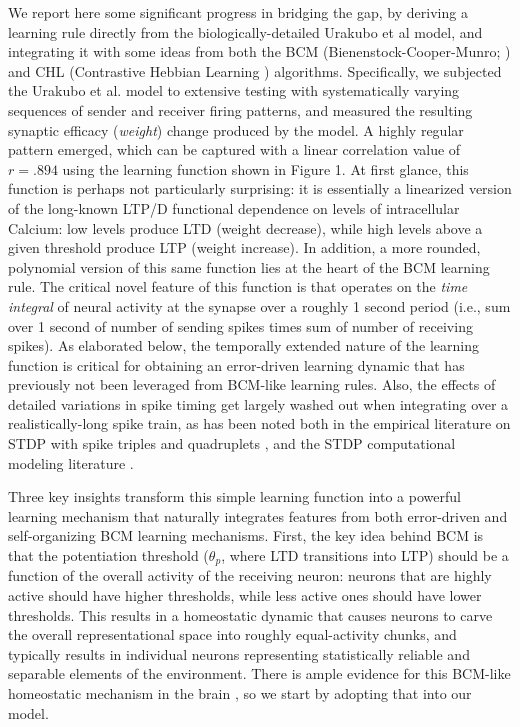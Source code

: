 \documentclass[11pt,twoside]{article}
\begin{document}
We report here some significant progress in bridging the gap, by deriving a
learning rule directly from the biologically-detailed Urakubo et al model, and
integrating it with some ideas from both the BCM (Bienenstock-Cooper-Munro;
\cite{bcm}) and CHL (Contrastive Hebbian Learning \cite{chl}) algorithms.
Specifically, we subjected the Urakubo et al. \cite{Urakubo} model to
extensive testing with systematically varying sequences of sender and receiver
firing patterns, and measured the resulting synaptic efficacy ({\em weight})
change produced by the model.  A highly regular pattern emerged, which can be
captured with a linear correlation value of $r=.894$ using the learning
function shown in Figure 1.  At first glance, this function is perhaps not
particularly surprising: it is essentially a linearized version of the
long-known LTP/D functional dependence on levels of intracellular Calcium: low
levels produce LTD (weight decrease), while high levels above a given
threshold produce LTP (weight increase).  In addition, a more rounded,
polynomial version of this same function lies at the heart of the BCM learning
rule.  The critical novel feature of this function is that operates on the
{\em time integral} of neural activity at the synapse over a roughly 1 second
period (i.e., sum over 1 second of number of sending spikes times sum of
number of receiving spikes).  As elaborated below, the temporally extended
nature of the learning function is critical for obtaining an error-driven
learning dynamic that has previously not been leveraged from BCM-like learning
rules.  Also, the effects of detailed variations in spike timing get largely
washed out when integrating over a realistically-long spike train, as has been
noted both in the empirical literature on STDP with spike triples and
quadruplets \cite{stdp_rate_code}, and the STDP computational modeling
literature \cite{stdp_rate_code_models}.

Three key insights transform this simple learning function into a powerful
learning mechanism that naturally integrates features from both error-driven
and self-organizing BCM learning mechanisms.  First, the key idea behind BCM
is that the potentiation threshold ($\theta_p$, where LTD transitions into
LTP) should be a function of the overall activity of the receiving neuron:
neurons that are highly active should have higher thresholds, while less
active ones should have lower thresholds.  This results in a homeostatic
dynamic that causes neurons to carve the overall representational space into
roughly equal-activity chunks, and typically results in individual neurons
representing statistically reliable and separable elements of the environment.
There is ample evidence for this BCM-like homeostatic mechanism in the brain
\cite{bcm_bio_data}, so we start by adopting that into our model.
\end{document}
